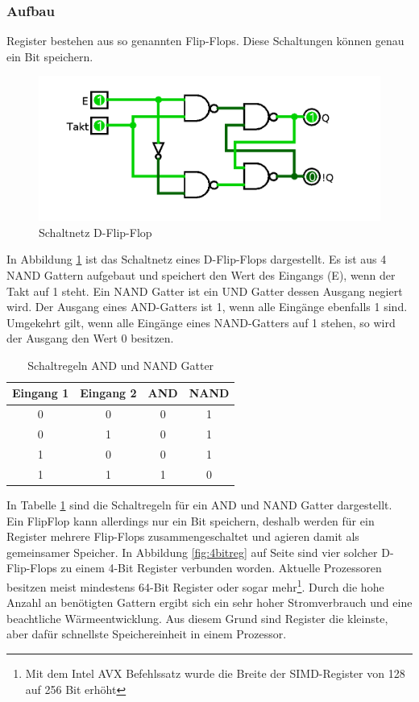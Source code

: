 \documentclass[a4paper,12pt]{article}
\begin{document}
\subsubsection{Aufbau}
Register bestehen aus so genannten Flip-Flops. Diese Schaltungen können genau ein Bit speichern. 

\begin{figure}[!htb]
\centering
\includegraphics[scale=0.30]{flipflop}
\caption{Schaltnetz D-Flip-Flop}
\label{fig:flipflop}
\end{figure}

\noindent In Abbildung \ref{fig:flipflop} ist das Schaltnetz eines D-Flip-Flops dargestellt. Es ist aus 4 NAND Gattern aufgebaut und speichert den Wert des Eingangs (E), wenn der Takt auf 1 steht. Ein NAND Gatter ist ein UND Gatter dessen Ausgang negiert wird. Der Ausgang eines AND-Gatters ist 1, wenn alle Eingänge ebenfalls 1 sind. Umgekehrt gilt, wenn alle Eingänge eines NAND-Gatters auf 1 stehen, so wird der Ausgang den Wert 0 besitzen.\cite[S.12-14]{elements2005}

\begin{table}[!htb]
\centering
\begin{tabular}{|c|c|c|c|}
\hline
Eingang 1 & Eingang 2 & AND & NAND \\ \hline
0         & 0         & 0   & 1    \\ \hline
0         & 1         & 0   & 1    \\ \hline
1         & 0         & 0   & 1    \\ \hline
1         & 1         & 1   & 0    \\ \hline
\end{tabular}
\caption{Schaltregeln AND und NAND Gatter}
\label{andnand}
\end{table}

\noindent In Tabelle \ref{andnand} sind die Schaltregeln für ein AND und NAND Gatter dargestellt. Ein FlipFlop kann allerdings nur ein Bit speichern, deshalb werden für ein Register mehrere Flip-Flops zusammengeschaltet und agieren damit als gemeinsamer Speicher. In Abbildung \ref{fig:4bitreg} auf Seite \pageref{page:4bitreg} sind vier solcher D-Flip-Flops zu einem 4-Bit Register verbunden worden.  Aktuelle Prozessoren besitzen meist mindestens 64-Bit Register oder sogar mehr\footnote{Mit dem Intel AVX Befehlssatz wurde die Breite der SIMD-Register von 128 auf 256 Bit erhöht\cite{lomont2011introduction}}. Durch die hohe Anzahl an benötigten Gattern ergibt sich ein sehr hoher Stromverbrauch und eine beachtliche Wärmeentwicklung. Aus diesem Grund sind Register die kleinste, aber dafür schnellste Speichereinheit in einem Prozessor.
\end{document}

